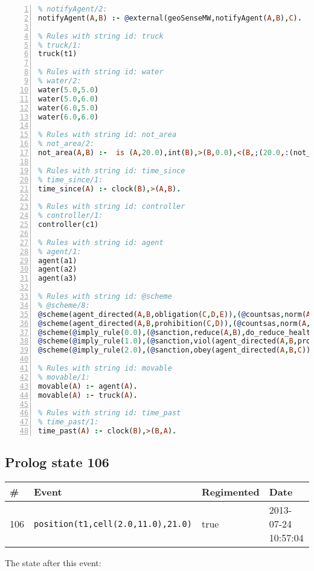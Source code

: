 \documentclass[11pt]{article}\usepackage[utf8]{inputenc}\usepackage{geometry}
\begin{document}
\begin{lstlisting}[language=Prolog, numbers=left]
% Rules with string id: notifyAgent
% notifyAgent/2:
notifyAgent(A,B) :- @external(geoSenseMW,notifyAgent(A,B),C).

% Rules with string id: truck
% truck/1:
truck(t1)

% Rules with string id: water
% water/2:
water(5.0,5.0)
water(5.0,6.0)
water(6.0,5.0)
water(6.0,6.0)

% Rules with string id: not_area
% not_area/2:
not_area(A,B) :-  is (A,20.0),int(B),>(B,0.0),<(B,;(20.0,:(not_area(A,B), is (-(B),20.0)))),int(A),>(A,0.0),<(A,;(20.0,:(area(A,B),-(int(A))))),int(B),>(A,0.0),>(B,0.0),<(A,21.0),<(B,21.0).

% Rules with string id: time_since
% time_since/1:
time_since(A) :- clock(B),>(A,B).

% Rules with string id: controller
% controller/1:
controller(c1)

% Rules with string id: agent
% agent/1:
agent(a1)
agent(a2)
agent(a3)

% Rules with string id: @scheme
% @scheme/8:
@scheme(agent_directed(A,B,obligation(C,D,E)),(@countsas,norm(A,B,F,obligation(C,D,E)),F),false,(listTrue(C)),(time_past(D)),false,[plus(viol(agent_directed(A,B,obligation(C,D,E))))|[]],[plus(obey(agent_directed(A,B,obligation(C,D,E))))|[]])
@scheme(agent_directed(A,B,prohibition(C,D)),(@countsas,norm(A,B,E,prohibition(C,D)),E),(listTrue(C)),false,(false),false,[plus(viol(agent_directed(A,B,prohibition(C,D))))|[]],[plus(obey(agent_directed(A,B,prohibition(C,D))))|[]])
@scheme(@imply_rule(0.0),(@sanction,reduce(A,B),do_reduce_health(A,B),notifyAgent(A,changed(status))),true,false,false,false,[min(reduce(A,B))|[]],[])
@scheme(@imply_rule(1.0),(@sanction,viol(agent_directed(A,B,prohibition(C,D))),do_sanction(D)),true,false,false,false,[min(viol(agent_directed(A,B,prohibition(C,D))))|[]],[])
@scheme(@imply_rule(2.0),(@sanction,obey(agent_directed(A,B,C))),true,false,false,false,[min(obey(agent_directed(A,B,C)))|[]],[])

% Rules with string id: movable
% movable/1:
movable(A) :- agent(A).
movable(A) :- truck(A).

% Rules with string id: time_past
% time_past/1:
time_past(A) :- clock(B),>(B,A).

\end{lstlisting}
\clearpage 
\subsection{Prolog state 106}
\begin{table}[ht]
\centering 
\begin{tabular}{l l l l} 
\textbf{\#} & \textbf{Event} & \textbf{Regimented} & \textbf{Date} \\ [0.5ex] 
\hline
106&\texttt{position(t1,cell(2.0,11.0),21.0)}&true&2013-07-24 10:57:04\\ [1ex] \hline\end{tabular}
\end{table}
The state after this event:
\end{document}
